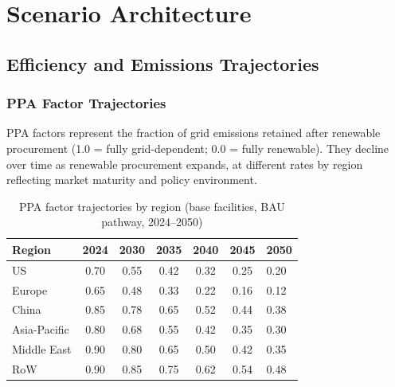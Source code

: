 \newpage
\section{Scenario Architecture}
\label{app:scenarios}


\subsection{Efficiency and Emissions Trajectories}
\label{app:efficiency}

\subsubsection{PPA Factor Trajectories}

PPA factors represent the fraction of grid emissions retained after renewable procurement
(1.0 = fully grid-dependent; 0.0 = fully renewable). They decline over time as renewable
procurement expands, at different rates by region reflecting market maturity and policy
environment.

\begin{table}[H]
\centering
\small
\caption{PPA factor trajectories by region (base facilities, BAU pathway, 2024--2050)}
\label{tab:app_ppa_traj}
\begin{tabular}{@{}lcccccl@{}}
\toprule
\textbf{Region} & \textbf{2024} & \textbf{2030} & \textbf{2035} & \textbf{2040} & \textbf{2045} & \textbf{2050} \\
\midrule
US & 0.70 & 0.55 & 0.42 & 0.32 & 0.25 & 0.20 \\
Europe & 0.65 & 0.48 & 0.33 & 0.22 & 0.16 & 0.12 \\
China & 0.85 & 0.78 & 0.65 & 0.52 & 0.44 & 0.38 \\
Asia-Pacific & 0.80 & 0.68 & 0.55 & 0.42 & 0.35 & 0.30 \\
Middle East & 0.90 & 0.80 & 0.65 & 0.50 & 0.42 & 0.35 \\
RoW & 0.90 & 0.85 & 0.75 & 0.62 & 0.54 & 0.48 \\
\bottomrule
\end{tabular}
\end{table}

